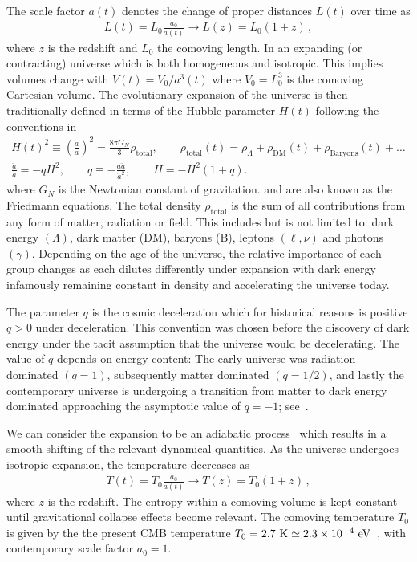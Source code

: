 The scale factor $a(t)$ denotes the change of proper distances $L(t)$ over time as
\begin{gather}
    L(t)=L_{0}\frac{a_{0}}{a(t)}\rightarrow L(z)=L_{0}(1+z)\,,
\end{gather}
where $z$ is the redshift and $L_{0}$ the comoving length. In an expanding (or contracting) universe which is both homogeneous and isotropic. This implies volumes change with $V(t)=V_{0}/a^{3}(t)$ where $V_{0}=L_{0}^{3}$ is the comoving Cartesian volume. The evolutionary expansion of the universe is then traditionally defined in terms of the Hubble parameter $H(t)$ following the conventions in~\cite{weinberg1972gravitation}
\begin{gather}
  \label{Friedmann:1} H(t)^{2}\equiv\left(\frac{\dot a}{a}\right)^2=\frac{8\pi G_{N}}{3}\rho_\mathrm{total},\qquad \rho_\mathrm{total}(t)=\rho_{\Lambda}+\rho_\mathrm{DM}(t)+\rho_\mathrm{Baryons}(t)+\ldots\\
  \label{Friedmann:2}
  \frac{\ddot a}{a}=-qH^2,\qquad 
q\equiv -\frac{a\ddot a}{\dot a^2},\qquad \dot H=-H^2(1+q).
\end{gather}
where $G_N$ is the Newtonian constant of gravitation.  and  are also known as the Friedmann equations. The total density $\rho_\mathrm{total}$ is the sum of all contributions from any form of matter, radiation or field. This includes but is not limited to: dark energy $(\Lambda)$, dark matter (DM), baryons (B), leptons $(\ell,\nu)$ and photons $(\gamma)$. Depending on the age of the universe, the relative importance of each group changes as each dilutes differently under expansion with dark energy infamously remaining constant in density and accelerating the universe today.

The parameter $q$ is the cosmic deceleration which for historical reasons is positive $q>0$ under deceleration. This convention was chosen before the discovery of dark energy under the tacit assumption that the universe would be decelerating. The value of $q$ depends on energy content: The early universe was radiation dominated $(q = 1)$, subsequently matter dominated $(q = 1/2)$, and lastly the contemporary universe is undergoing a transition from matter to dark energy dominated approaching the asymptotic value of $q = -1$; see~\cite{Rafelski:2013yka}.

We can consider the expansion to be an adiabatic process~\citep{Abdalla:2022yfr} which results in a smooth shifting of the relevant dynamical quantities. As the universe undergoes isotropic expansion, the temperature decreases as 
\begin{gather}
 \label{tscale}
 T(t)=T_{0}\frac{a_{0}}{a(t)}\rightarrow T(z)=T_{0}(1+z)\,,
\end{gather}
where $z$ is the redshift. The entropy within a comoving volume is kept constant until gravitational collapse effects become relevant. The comoving temperature $T_{0}$ is given by the the present CMB temperature $T_{0}=2.7{\rm\ K}\simeq2.3\times10^{-4}\eV$~\citep{Planck:2018vyg}, with contemporary scale factor $a_{0}=1$.

